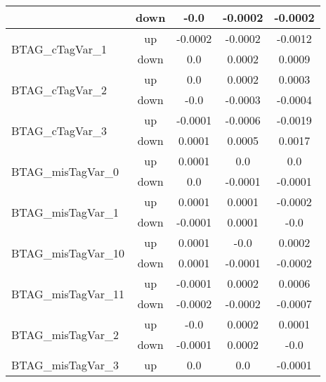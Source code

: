\begin{table}[h!]
\begin{tabular}{lcccc}
                                       & down &     -0.0     &     -0.0002     &     -0.0002       \\ \hline
\multirow{2}{*}{BTAG\_cTagVar\_1}      & up   &     -0.0002     &     -0.0002     &     -0.0012      \\
                                       & down &     0.0     &     0.0002     &     0.0009       \\ \hline
\multirow{2}{*}{BTAG\_cTagVar\_2}      & up   &     0.0     &     0.0002     &     0.0003      \\
                                       & down &     -0.0     &     -0.0003     &     -0.0004       \\ \hline
\multirow{2}{*}{BTAG\_cTagVar\_3}      & up   &     -0.0001     &     -0.0006     &     -0.0019      \\
                                       & down &     0.0001     &     0.0005     &     0.0017       \\ \hline
\multirow{2}{*}{BTAG\_misTagVar\_0}      & up   &     0.0001     &     0.0     &     0.0      \\
                                       & down &     0.0     &     -0.0001     &     -0.0001       \\ \hline
\multirow{2}{*}{BTAG\_misTagVar\_1}      & up   &     0.0001     &     0.0001     &     -0.0002      \\
                                       & down &     -0.0001     &     0.0001     &     -0.0       \\ \hline
\multirow{2}{*}{BTAG\_misTagVar\_10}      & up   &     0.0001     &     -0.0     &     0.0002      \\
                                       & down &     0.0001     &     -0.0001     &     -0.0002       \\ \hline
\multirow{2}{*}{BTAG\_misTagVar\_11}      & up   &     -0.0001     &     0.0002     &     0.0006      \\
                                       & down &     -0.0002     &     -0.0002     &     -0.0007       \\ \hline
\multirow{2}{*}{BTAG\_misTagVar\_2}      & up   &     -0.0     &     0.0002     &     0.0001      \\
                                       & down &     -0.0001     &     0.0002     &     -0.0       \\ \hline
\multirow{2}{*}{BTAG\_misTagVar\_3}      & up   &     0.0     &     0.0     &     -0.0001      \\

\end{tabular}
\end{table}
